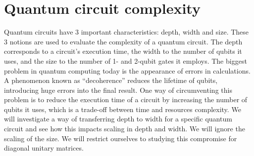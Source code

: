 \section{Quantum circuit complexity}

Quantum circuits have 3 important characteristics: depth, width and size. These 3 notions are used to evaluate the complexity of a quantum circuit. The depth corresponds to a circuit's execution time, the width to the number of qubits it uses, and the size to the number of 1- and 2-qubit gates it employs. The biggest problem in quantum computing today is the appearance of errors in calculations. A phenomenon known as “decoherence” reduces the lifetime of qubits, introducing huge errors into the final result. One way of circumventing this problem is to reduce the execution time of a circuit by increasing the number of qubits it uses, which is a trade-off between time and resources complexity. We will investigate a way of transferring depth to width for a specific quantum circuit and see how this impacts scaling in depth and width.  We will ignore the scaling of the size. We will restrict ourselves to studying this compromise for diagonal unitary matrices.

